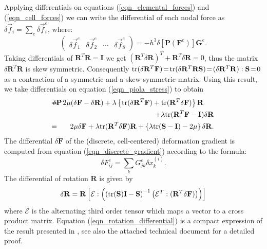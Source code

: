 Applying differentials on equations (\ref{eqn_elemental_forces}) and (\ref{eqn_cell_forces}) we can write the differential of each nodal force
as $\delta\vec{f}_i\!=\!\sum_e\delta\vec{f}_i^e$, where:
\begin{equation}
\left(
\begin{array}{cccc}
\delta\vec{f}_1^e &
\delta\vec{f}_2^e &
\cdots &
\delta\vec{f}_8^e
\end{array}
\right)
=-h^3\delta\left[\mathbf{P}(\mathbf{F}^e)\right]\mathbf{G}^e.
\label{eqn_elemental_force_differentials}
\end{equation}
Taking differentials of $\mathbf{R}^T\mathbf{R}\!\!=\!\!\mathbf{I}$ we get $(\mathbf{R}^T\!\delta\mathbf{R})^T\!+\!\mathbf{R}^T\!\delta\mathbf{R}\!=\!0$, thus the matrix $\delta\mathbf{R}^T\mathbf{R}$
is skew symmetric. Consequently $\mbox{tr}(\delta\mathbf{R}^T\mathbf{F})\!=\!\mbox{tr}(\delta\mathbf{R}^T\mathbf{RS})\!=\!(\delta\mathbf{R}^T\mathbf{R}):\mathbf{S}\!=\!0$ as a contraction of a
symmetric and a skew symmetric matrix. Using this result, we take differentials on equation (\ref{eqn_piola_stress}) to obtain
\begin{eqnarray}
  \delta\mathbf{P}\hspace*{-.12in}&\hspace*{-.12in}=\hspace*{-.12in}&2\mu(\delta\mathbf{F}-\delta\mathbf{R})+\lambda\left\{\tr(\delta\mathbf{R}^T\mathbf{F})
  +\tr(\mathbf{R}^T\delta\mathbf{F})\right\}\mathbf{R}\hspace{.2in} \nonumber \\ 
&&+\lambda\tr(\mathbf{R}^T\mathbf{F}-\mathbf{I})\delta\mathbf{R} \nonumber \\
  &\hspace*{-.12in}=\hspace*{-.12in}&2\mu\delta\mathbf{F}+\lambda\tr(\mathbf{R}^T\delta\mathbf{F})\mathbf{R}
  +\left\{\lambda\tr(\mathbf{S}-\mathbf{I})-2\mu\right\}\delta\mathbf{R}. \label{eqn_stress_differential}
\end{eqnarray}
The differential $\delta\mathbf{F}$ of the (discrete, cell-centered) deformation gradient is computed from equation (\ref{eqn_discrete_gradient}) according to the formula:
\begin{equation}
\delta F_{ij}^e=\sum_kG_{jk}^e\delta x_k^{(i)}.
\label{eqn_deformation_gradient_differential}
\end{equation}
The differential of rotation $\mathbf{R}$ is given by
\begin{equation}
\delta\mathbf{R}=\mathbf{R}\left[\mathcal{E}:\left(\left(\mbox{tr}(\mathbf{S})\mathbf{I}-\mathbf{S}\right)^{-1}\left(\mathcal{E}^T:(\mathbf{R}^T\delta\mathbf{F})\right)\right)\right]
\label{eqn_rotation_differential}
\end{equation}
where $\mathcal{E}$ is the {alternating third order tensor}  which maps a vector
to a cross product matrix. Equation (\ref{eqn_rotation_differential}) is a compact expression of the result presented in \cite{twigg2010point}, see also the attached technical document
for a detailed proof.

